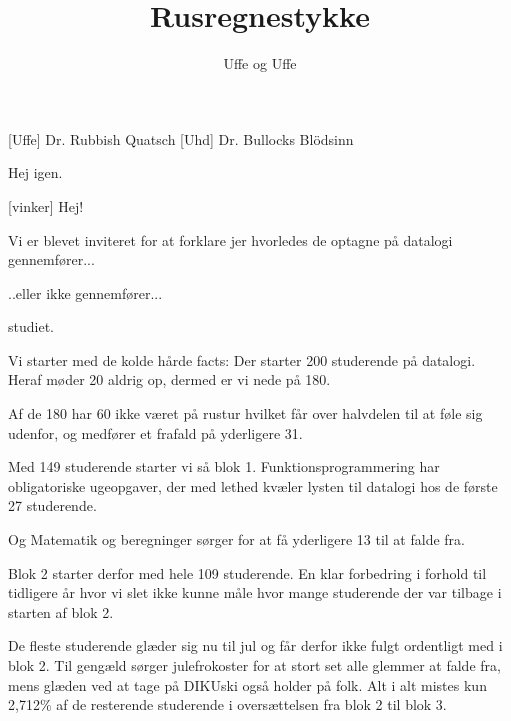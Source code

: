 \documentclass[a4paper,11pt]{article}
\title{Rusregnestykke}
\author{Uffe og Uffe}
\begin{document}
\maketitle

\begin{roles}
[Uffe] Dr. Rubbish Quatsch
[Uhd] Dr. Bullocks Bl\"odsinn
\end{roles}

\begin{props}

\end{props}

  
\begin{sketch}

 Hej igen. 

[vinker] Hej!

 Vi er blevet inviteret for at forklare jer hvorledes de optagne på datalogi gennemfører...

 ..eller ikke gennemfører...

 studiet.

 Vi starter med de kolde hårde facts: Der starter 200 studerende på datalogi.  Heraf møder 20 aldrig op, dermed er vi nede på 180.

 Af de 180 har 60 ikke været på rustur hvilket får over halvdelen til at føle sig udenfor, og medfører et frafald på yderligere 31.

 Med 149 studerende starter vi så blok 1. Funktionsprogrammering har obligatoriske ugeopgaver, der med lethed kvæler lysten til datalogi hos de første 27 studerende.

 Og Matematik og beregninger sørger for at få yderligere 13 til at falde fra.

 Blok 2 starter derfor med hele 109 studerende. En klar forbedring i forhold til tidligere år hvor vi slet ikke kunne måle hvor mange studerende der var tilbage i starten af blok 2.

 De fleste studerende glæder sig nu til jul og får derfor ikke fulgt ordentligt med i blok 2. Til gengæld sørger julefrokoster for at stort set alle glemmer at falde fra, mens glæden ved at tage på DIKUski også holder på folk. Alt i alt mistes kun 2,712\% af de resterende studerende i oversættelsen fra blok 2 til blok 3.


\end{sketch}
\end{document}
